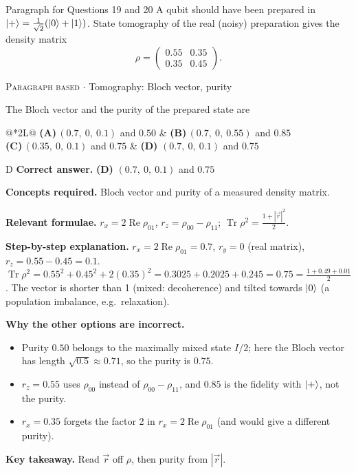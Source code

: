 \documentclass[11pt,a4paper]{article}
\newcommand{\optlabel}[1]{\textbf{(#1)}}
\newcommand{\correctlabel}[1]{\textcolor{okgreen}{\textbf{(#1)}\,\ding{51}}}
\newenvironment{qitem}[1]{\begin{list}{}{\setlength{\leftmargin}{3.3em}\setlength{\labelwidth}{3.1em}%
  \setlength{\labelsep}{0.2em}\setlength{\topsep}{3pt}\setlength{\parsep}{3pt}}\item[\textbf{Q.#1}\hfill]}{\end{list}}
\newcommand{\qsep}{\par\vspace{2pt}{\color{black!15}\hrule}\vspace{4pt}}
\newcommand{\qmeta}[2]{{\footnotesize\color{black!60}\textsc{#1} \;$\cdot$\; #2}\par}
\begin{document}
\begin{passagebox}{Paragraph for Questions 19 and 20}
A qubit should have been prepared in $\ket+ = \frac{1}{\sqrt2}(\ket0 + \ket1)$. State tomography of the real (noisy)
preparation gives the density matrix
\[ \rho = \begin{pmatrix}0.55 & 0.35\\ 0.35 & 0.45\end{pmatrix}. \]
\end{passagebox}
\begin{qitem}{19}
\qmeta{Paragraph based}{Tomography: Bloch vector, purity}
The Bloch vector and the purity of the prepared state are
\par\smallskip\noindent\begin{tabularx}{\linewidth}{@{}*{2}{L}@{}}
\optlabel{A}\,$(0.7,\ 0,\ 0.1)$ and $0.50$ & \optlabel{B}\,$(0.7,\ 0,\ 0.55)$ and $0.85$ \\[3pt]
\optlabel{C}\,$(0.35,\ 0,\ 0.1)$ and $0.75$ & \correctlabel{D}\,$(0.7,\ 0,\ 0.1)$ and $0.75$
\end{tabularx}
\end{qitem}
\begin{solbox}{D}
\textbf{\color{brand}Correct answer.} \textcolor{okgreen}{\textbf{(D)}} $(0.7,\ 0,\ 0.1)$ and $0.75$

\textbf{\color{brand}Concepts required.} Bloch vector and purity of a measured density matrix.

\textbf{\color{brand}Relevant formulae.} $r_x = 2\operatorname{Re}\rho_{01}$, $r_z = \rho_{00} - \rho_{11}$; $\operatorname{Tr}\rho^2 = \frac{1 + |\vec r|^2}{2}$.

\textbf{\color{brand}Step-by-step explanation.} $r_x = 2\operatorname{Re}\rho_{01} = 0.7$, $r_y = 0$ (real matrix), $r_z = 0.55 - 0.45 = 0.1$.
$\operatorname{Tr}\rho^2 = 0.55^2 + 0.45^2 + 2(0.35)^2 = 0.3025 + 0.2025 + 0.245 = 0.75 = \frac{1 + 0.49 + 0.01}{2}$. The vector is shorter than 1
(mixed: decoherence) and tilted towards $\ket0$ (a population imbalance, e.g.\ relaxation).

\textbf{\color{brand}Why the other options are incorrect.}
\begin{itemize}[leftmargin=2.4em, itemsep=1pt, topsep=2pt]
\item[\textbf{(A)}] Purity $0.50$ belongs to the maximally mixed state $I/2$; here the Bloch vector has length $\sqrt{0.5} \approx 0.71$, so the purity is $0.75$.
\item[\textbf{(B)}] $r_z = 0.55$ uses $\rho_{00}$ instead of $\rho_{00} - \rho_{11}$, and $0.85$ is the fidelity with $\ket+$, not the purity.
\item[\textbf{(C)}] $r_x = 0.35$ forgets the factor 2 in $r_x = 2\operatorname{Re}\rho_{01}$ (and would give a different purity).
\end{itemize}
\textbf{\color{brand}Key takeaway.} Read $\vec r$ off $\rho$, then purity from $|\vec r|$.
\end{solbox}
\qsep
\end{document}
